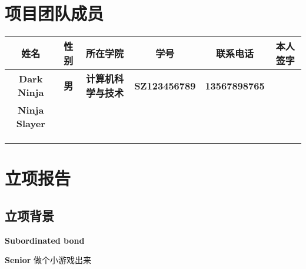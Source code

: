 \documentclass[12pt]{article}
\begin{document}
\section{ 项目团队成员 }
\begin{table}[h]
	\centering
	\begin{adjustbox}{width=1\textwidth}
		\begin{tabular}{|c|c|c|c|c|c|}
			\hline
			\textbf{姓名}         & \textbf{性别} & \textbf{所在学院} & \textbf{学号} & \textbf{联系电话} & \textbf{本人签字} \\ \hline
			\textbf{Dark Ninja}   & \textbf{男}     & \textbf{计算机科学与技术}         & \textbf{SZ123456789}     & \textbf{13567898765}         & \textbf{}         \\ \hline
			\textbf{Ninja Slayer} & \textbf{}     & \textbf{}         & \textbf{}     & \textbf{}         & \textbf{}         \\ \hline
			\textbf{}             & \textbf{}     & \textbf{}         & \textbf{}     & \textbf{}         & \textbf{}         \\ \hline
			\textbf{}             & \textbf{}     & \textbf{}         & \textbf{}     & \textbf{}         & \textbf{}         \\ \hline
			\textbf{}             & \textbf{}     & \textbf{}         & \textbf{}     & \textbf{}         & \textbf{}         \\ \hline
		\end{tabular}
	\end{adjustbox}
\end{table}

\section{ 立项报告 }
\subsection{ 立项背景 }
\begin{stretchbox}{%
  \textbf{Subordinated bond} 
  \par
  \textbf{Senior} 做个小游戏出来%
  \vfill
  \hfill
}
\end{stretchbox}
\end{document}
